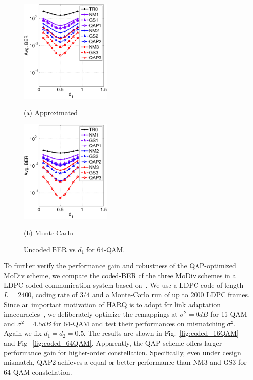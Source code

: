 \documentclass[journal]{IEEEtran}
\begin{document}
\begin{figure}[htb]
  \begin{minipage}[b]{.48\linewidth}
    \centering
    \centerline{\includegraphics[width=4.5cm]{./figs/BER_distance_approx_64QAM.eps}}
    \centerline{(a) Approximated}\medskip
  \end{minipage}
  \hfill
  \begin{minipage}[b]{0.48\linewidth}
    \centering
    \centerline{\includegraphics[width=4.5cm]{./figs/BER_distance_MonteCarlo_64QAM.eps}}
    \centerline{(b) Monte-Carlo}\medskip
  \end{minipage}
  \caption{Uncoded BER vs $d_1$ for 64-QAM.}
  \label{fig:uncoded_position}
\end{figure}

To further verify the performance gain and robustness of the
QAP-optimized MoDiv scheme, we compare the coded-BER of the three MoDiv schemes
in a LDPC-coded communication system based on~\cite{hochwald2003achieving}. We
use a LDPC code of length $L=2400$, coding rate of $3/4$ and a Monte-Carlo run of up to 2000 LDPC
frames. Since an important motivation of HARQ is to adopt for link adaptation
inaccuracies~\cite{cheng2006coding}, we deliberately optimize the remappings at
$\sigma^2=0dB$ for 16-QAM and $\sigma^2=4.5dB$ for 64-QAM and test their performances on
mismatching $\sigma^2$. Again we fix $d_1=d_2=0.5$. The results are shown in
Fig.~\ref{fig:coded_16QAM} and Fig.~\ref{fig:coded_64QAM}. Apparently, the QAP scheme offers larger performance gain for higher-order constellation. Specifically, even under
design mismatch, QAP2 achieves a equal or better performance than NM3 and GS3
for 64-QAM constellation.
\end{document}
